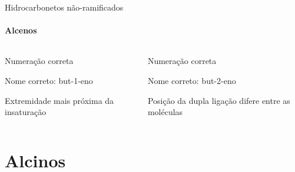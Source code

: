\documentclass[presentation,professionalfonts,smaller,aspectratio=169]{beamer}
\begin{document}
\begin{frame}[label={sec:org790b912}]{Hidrocarbonetos não-ramificados}
\framesubtitle{Alcenos}
\begin{columns}
\begin{column}{0.45\columnwidth}
\begin{block}{Numeração correta}
\vspace{.5cm}



\vspace{.5cm}

Nome correto: \alert{but-1-eno} 

\vspace{.5cm}

Extremidade mais próxima da insaturação
\end{block}
\end{column}

\begin{column}{0.45\columnwidth}
\begin{block}{Numeração correta}
\vspace{.5cm}


\vspace{.5cm}

Nome correto: \alert{but-2-eno}

\vspace{.5cm}

Posição da dupla ligação difere entre as moléculas
\end{block}
\end{column}
\end{columns}
\end{frame}


\section{Alcinos}
\label{sec:org4349d46}
\end{document}
